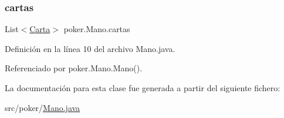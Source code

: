 \subsubsection{\texorpdfstring{cartas}{cartas}}
{\footnotesize\ttfamily List$<$\mbox{\hyperlink{classpoker_1_1Carta}{Carta}}$>$ poker.\+Mano.\+cartas\hspace{0.3cm}{\ttfamily [private]}}



Definición en la línea 10 del archivo Mano.\+java.



Referenciado por poker.\+Mano.\+Mano().



La documentación para esta clase fue generada a partir del siguiente fichero\+:\begin{DoxyCompactItemize}
\item 
src/poker/\mbox{\hyperlink{Mano_8java}{Mano.\+java}}\end{DoxyCompactItemize}
